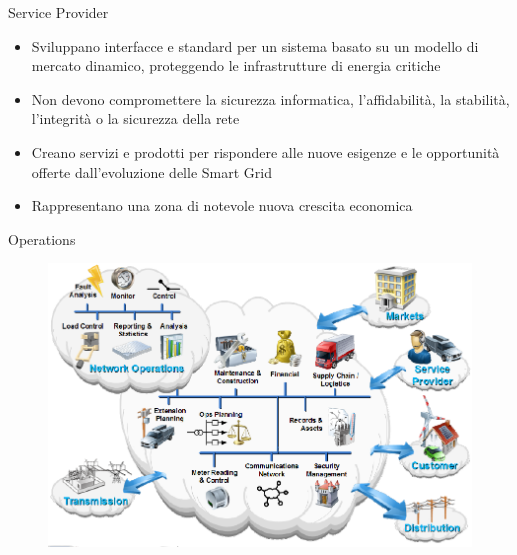 \begin{frame}[fragile]{Service Provider}
	\begin{itemize}[<+- | alert@+>]
		\item Sviluppano interfacce e standard per un sistema basato su un modello di mercato dinamico, proteggendo le infrastrutture di energia critiche   
		\item Non devono compromettere la sicurezza informatica, l'affidabilità, la stabilità, l'integrità o la sicurezza della rete %
		\item Creano servizi e prodotti per rispondere alle nuove esigenze e le opportunità offerte dall'evoluzione delle Smart Grid 
		\item Rappresentano una zona di notevole nuova crescita economica
	\end{itemize}
\end{frame}




\begin{frame}[fragile]{Operations}
	\begin{figure}[h] 
		\includegraphics[scale=0.45]{imgs/ope.png}
	\end{figure}
\end{frame}



